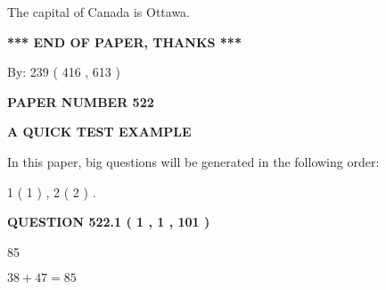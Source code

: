 \documentclass[12pt]{article}
\begin{document}
  
 
 
\noindent{}
 
 
The capital of Canada is Ottawa.
 
 
 
 
   
   
 \vspace{0.2in}
 
   
   
   
   
\vspace{1.0in} 
{\textbf{\large{ *** END OF PAPER, THANKS *** }}} 
   
   
\hspace{1.0in} By: 
 239 ( 416 ,  613 )
   
   
   
   
\newpage 
\setcounter{page}{ 
   522001 } 
   
   
   
   
 {\textbf{ \Large{ PAPER NUMBER  522  }}}
   
   
\vspace{0.2in}
   
   
   
   
   
   
 \vspace{0.2in}
{\LARGE {\textbf{ A QUICK TEST EXAMPLE}}}
   
   
   
\vspace{0.2in}
   
In this paper, big questions will be generated in the following order: 
   
   
   1 ( 1 )
 ,
   2 ( 2 )
 .
  
\vspace{0.2in}
  
{\textbf{\Large{QUESTION
522.1 
 ( 1 , 1 , 101 )
}}}
  
  
 
 
\noindent{}

85
 
 
 
 
\noindent{}

$ %
38 +  %
47=   %
85$
 
\end{document}
